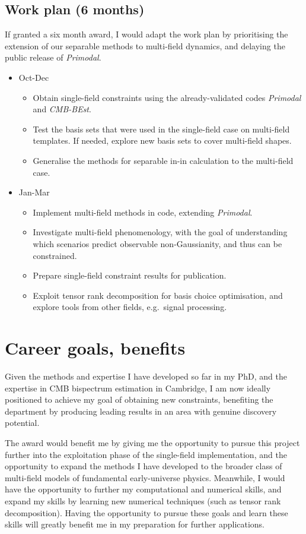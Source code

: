 \subsection{Work plan (6 months)}
If granted a six month award, I would adapt the work plan by prioritising the
extension of our separable methods to multi-field dynamics, and delaying the 
public release of \textit{Primodal}.
\begin{itemize}
	\item Oct-Dec
	\begin{itemize}
        \item Obtain single-field constraints using the already-validated codes \textit{Primodal} and \textit{CMB-BEst}.
        \item Test the basis sets that were used in the single-field case on multi-field templates.
            If needed, explore new basis sets to cover multi-field shapes.
        \item Generalise the methods for separable in-in calculation to the multi-field case.
	\end{itemize}
	\item Jan-Mar
	\begin{itemize}
        \item Implement multi-field methods in code, extending \textit{Primodal}.
        \item Investigate multi-field phenomenology, with the goal of understanding which scenarios predict observable non-Gaussianity, and thus can be constrained.
        \item Prepare single-field constraint results for publication.
        \item Exploit tensor rank decomposition for basis choice optimisation, and explore tools from other fields, e.g.~signal processing.
	\end{itemize}
\end{itemize}


\section{Career goals, benefits}
Given the methods and expertise I have developed so far in my PhD,
and the expertise in CMB bispectrum estimation in Cambridge, I am now ideally
positioned to achieve my goal of obtaining new constraints,
benefiting the department by producing leading results in an area with genuine discovery potential.

The award would benefit me by giving me the opportunity to pursue this project further
into the exploitation phase of the single-field implementation,
and the opportunity to expand the methods I have developed to the broader class
of multi-field models of fundamental early-universe physics.
Meanwhile, I would have the opportunity to further my computational
and numerical skills, and expand my skills by learning new
numerical techniques (such as tensor rank decomposition).
Having the opportunity to pursue these goals and learn these skills will greatly benefit
me in my preparation for further applications.

